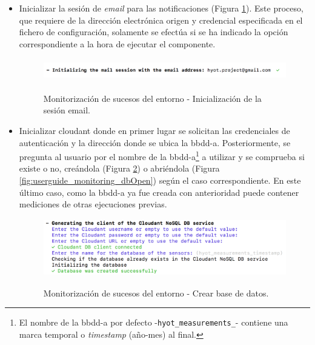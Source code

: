 \documentclass[12pt,a4paper, twoside]{report}
\begin{document}
\begin{itemize}
\begin{itemize}
	 		\end{itemize} 
	 	
	 	\item Inicializar la sesión de \textit{email} para las notificaciones (Figura \ref{fig:userguide_monitoring_mail}). Este proceso, que requiere de la dirección electrónica origen y credencial especificada en el fichero de configuración, solamente se efectúa si se ha indicado la opción correspondiente a la hora de ejecutar el componente.
	 	
	 		\begin{figure}[!ht]   
				\caption{Monitorización de sucesos del entorno - Inicialización de la sesión email.} 
				\begin{center} 
					\includegraphics[width=14cm,height=1cm]{Images/userGuide/monitoring/mail} \\
					\label{fig:userguide_monitoring_mail} 
				\end{center}  
			\end{figure}
	 
	 	\item Inicializar \gls{cloudant} donde en primer lugar se solicitan las credenciales de autenticación y la dirección donde se ubica la \gls{bbdd-a}. Posteriormente, se pregunta al usuario por el nombre de la \gls{bbdd-a}\footnote{El nombre de la \gls{bbdd-a} por defecto -\texttt{hyot\_measurements\_}- contiene una marca temporal o \textit{timestamp} (año-mes) al final.} a utilizar y se comprueba si existe o no, creándola (Figura \ref{fig:userguide_monitoring_dbCreate}) o abriéndola (Figura \ref{fig:userguide_monitoring_dbOpen}) según el caso correspondiente. En este último caso, como la \gls{bbdd-a} ya fue creada con anterioridad puede contener mediciones de otras ejecuciones previas.
	 	
	 		 \begin{figure}[!ht]   
				\caption{Monitorización de sucesos del entorno - Crear base de datos.} 
				\begin{center} 
					\includegraphics[width=13cm,height=2.5cm]{Images/userGuide/monitoring/dbCreate} \\
					\label{fig:userguide_monitoring_dbCreate} 
				\end{center}  
			\end{figure}
			

\end{itemize}
\end{document}
